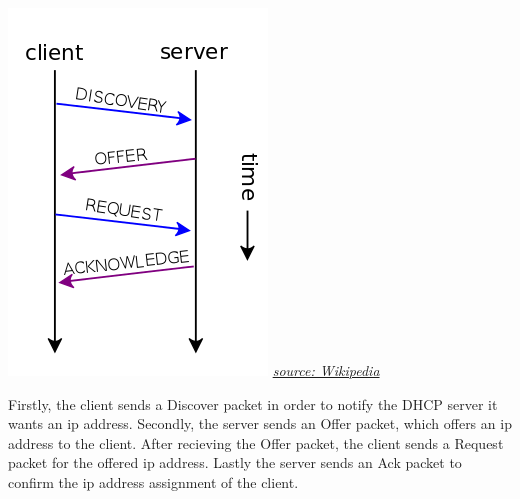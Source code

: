 \includegraphics[scale=0.5]{images/dhcp.png}
\newline
\href{https://en.wikipedia.org/wiki/File:DHCP_session.svg}{\color{red}\textit{source: Wikipedia}}

Firstly, the client sends a Discover packet in order to notify the DHCP server it wants an ip address. Secondly, the server sends an Offer packet, which offers an ip address to the client. After recieving the Offer packet, the client sends a Request packet for the offered ip address. Lastly the server sends an Ack packet to confirm the ip address assignment of the client.
